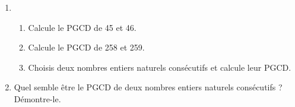 
\begin{enumerate}
\item
  \begin{enumerate}
  \item Calcule le PGCD de 45 et 46.
  \item Calcule le PGCD de 258 et 259.
  \item Choisis deux nombres entiers naturels consécutifs et calcule leur PGCD.
  \end{enumerate}
\item Quel semble être le PGCD de deux nombres entiers naturels consécutifs ? Démontre-le.
\end{enumerate}
